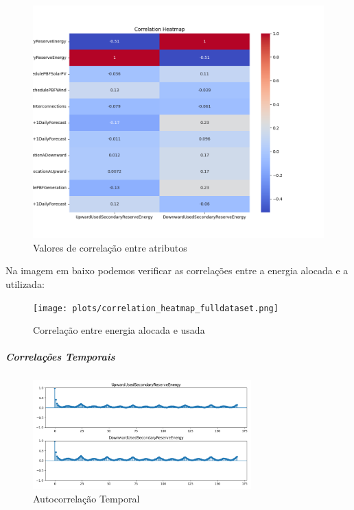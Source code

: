 \begin{figure}[H]
  \centering
  \includegraphics[width=\textwidth]{plots/correlation_heatmap.png}
  \caption{Valores de correlação entre atributos}
  \label{fig:correlationheatmap}
\end{figure}

Na imagem em baixo podemos verificar as correlações entre a energia alocada e a utilizada:\par

\begin{figure}[H]
  \centering
  \texttt{[image: plots/correlation\_heatmap\_fulldataset.png]}
  \caption{Correlação entre energia alocada e usada}
  \label{fig:benchmarkcorr_fulldataset}
\end{figure}


\subparagraph{Correlações Temporais}
\text{ }  \par

\begin{figure}[H]
  \centering
  \includegraphics[width=0.75\textwidth]{plots/autocorrelation.png}
  \caption{Autocorrelação Temporal}
  \label{fig:autocorrelation}
\end{figure}

